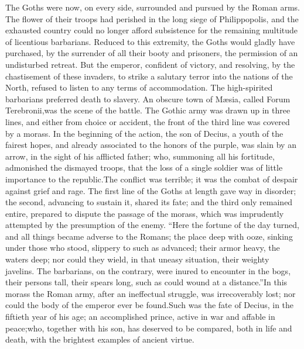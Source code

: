 

The Goths were now, on every side, surrounded and pursued by the
Roman arms. The flower of their troops had perished in the long
siege of Philippopolis, and the exhausted country could no longer
afford subsistence for the remaining multitude of licentious
barbarians. Reduced to this extremity, the Goths would gladly
have purchased, by the surrender of all their booty and
prisoners, the permission of an undisturbed retreat. But the
emperor, confident of victory, and resolving, by the chastisement
of these invaders, to strike a salutary terror into the nations
of the North, refused to listen to any terms of accommodation.
The high-spirited barbarians preferred death to slavery. An
obscure town of Mæsia, called Forum Terebronii,\footnotemark[44] was the scene
of the battle. The Gothic army was drawn up in three lines, and
either from choice or accident, the front of the third line was
covered by a morass. In the beginning of the action, the son of
Decius, a youth of the fairest hopes, and already associated to
the honors of the purple, was slain by an arrow, in the sight of
his afflicted father; who, summoning all his fortitude,
admonished the dismayed troops, that the loss of a single soldier
was of little importance to the republic.\footnotemark[45] The conflict was
terrible; it was the combat of despair against grief and rage.
The first line of the Goths at length gave way in disorder; the
second, advancing to sustain it, shared its fate; and the third
only remained entire, prepared to dispute the passage of the
morass, which was imprudently attempted by the presumption of the
enemy. “Here the fortune of the day turned, and all things became
adverse to the Romans; the place deep with ooze, sinking under
those who stood, slippery to such as advanced; their armor heavy,
the waters deep; nor could they wield, in that uneasy situation,
their weighty javelins. The barbarians, on the contrary, were
inured to encounter in the bogs, their persons tall, their spears
long, such as could wound at a distance.”\footnotemark[46] In this morass the
Roman army, after an ineffectual struggle, was irrecoverably
lost; nor could the body of the emperor ever be found.\footnotemark[47] Such
was the fate of Decius, in the fiftieth year of his age; an
accomplished prince, active in war and affable in peace;\footnotemark[48] who,
together with his son, has deserved to be compared, both in life
and death, with the brightest examples of ancient virtue.\footnotemark[49]

